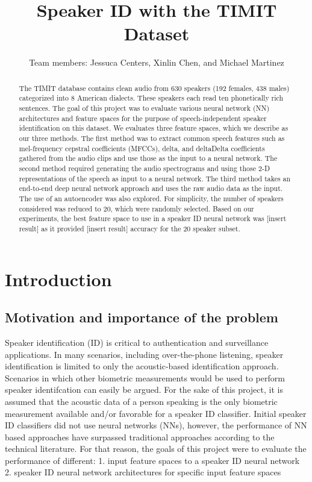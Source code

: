 \documentclass{article}
\title{Speaker ID with the TIMIT Dataset}
\author{
  Team members: Jessuca Centers, Xinlin Chen, and Michael Martinez 
}
\newcommand\tab[1][1cm]{\hspace*{#1}}
\begin{document}
\maketitle
\section*{}
\begin{abstract}
The TIMIT database contains clean audio from 630 speakers (192 females, 438 males) categorized into 8 American dialects. 
These speakers each read ten phonetically rich sentences. 
The goal of this project was to evaluate various neural network (NN) architectures and feature spaces for the purpose of speech-independent speaker identification on this dataset. 
We evaluates three feature spaces, which we describe as our three methods. 
The first method was to extract common speech features such as mel-frequency cepstral coefficients (MFCCs), delta, and deltaDelta coefficients gathered from the audio clips and use those as the input to a neural network. 
The second method required generating the audio spectrograms and using those 2-D representations of the speech as input to a neural network. 
The third method takes an end-to-end deep neural network approach and uses the raw audio data as the input. 
The use of an autoencoder was also explored. 
For simplicity, the number of speakers considered was reduced to 20, which were randomly selected. 
Based on our experiments, the best feature space to use in a speaker ID neural network was [insert result] as it provided [insert result] accuracy for the 20 speaker subset. 
\end{abstract}
\newpage

\section{Introduction}
\subsection{Motivation and importance of the problem}
Speaker identification (ID) is critical to authentication and surveillance applications. 
In many scenarios, including over-the-phone listening, speaker identification is limited to only the acoustic-based identification approach. Scenarios in which other biometric measurements would be used to perform speaker identifcation can easily be argued.
For the sake of this project, it is assumed that the acoustic data of a person speaking is the only biometric measurement available and/or favorable for a speaker ID classifier.
Initial speaker ID classifiers did not use neural networks (NNs), however, the performance of NN based approaches have surpassed traditional approaches according to the technical literature.
For that reason, the goals of this project were to evaluate the performance of different:
\newline
\tab 1. input feature spaces to a speaker ID neural network
\newline
\tab 2. speaker ID neural network architectures for specific input feature spaces
\end{document}

